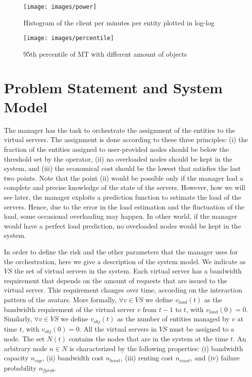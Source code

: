\documentclass[final,10pt,a5paper]{phdimt}
\theoremstyle{definition}
\begin{document}
\begin{figure}[tbh]
\centering
\texttt{[image: images/power]}
\caption{Histogram of the client per minutes per entity plotted in log-log}\label{fig:power}
\end{figure}


\begin{figure}[tbh]
\centering
\texttt{[image: images/percentile]}
\caption{95th percentile of MT with different amount of objects}\label{fig:percentile}
\end{figure}








\section{Problem Statement and System Model}
\label{sec:problem}


The manager has the task to orchestrate the assignment of the entities to the virtual servers.
The assignment is done according to these three principles: 
(i) the fraction of the entities assigned to user-provided nodes should be below the threshold set by the operator, 
(ii) no overloaded nodes should be kept in the system, and 
(iii) the economical cost should be the lowest that satisfies the last two points.
Note that the point (ii)  would be possible only if the manager had a complete and precise knowledge of the state of the servers.
However, how we will see later, the manager exploits a prediction function to estimate the load of the servers.
Hence, due to the error in the load estimation and the fluctuation of the load, some occasional overloading may happen.
In other world, if the manager would have a perfect load prediction, no overloaded nodes would be kept in the system.



In order to define the risk and the other parameters that the manager uses for the orchestration, here we give a description of the system model. We indicate as $VS$ the set of virtual servers in the system.
Each virtual server has a bandwidth requirement that depends on the amount of requests that are issued to the virtual server. This requirement changes over time, according on the interaction pattern of the avatars. More formally, $\forall v \in VS$ we define $v_{load}(t)$ as the bandwidth requirement of the virtual server $v$ from $t-1$ to $t$, with $v_{load}(0) = 0$. Similarly, $\forall v \in VS$ we define $v_{obj}(t)$ as the number of entities managed by $v$ at time $t$, with  $v_{obj}(0) = 0$.
All the virtual servers in $VS$ must be assigned to a node. The set $N(t)$ contains the nodes that are in the system at the time $t$.
An arbitrary node $n \in N$ is characterized by the following properties: (i) bandwidth capacity $n_{cap}$, (ii) bandwidth cost $n_{bcost}$, (iii) renting cost $n_{rcost}$, and (iv) failure probability $n_{fprob}$.
\end{document}
